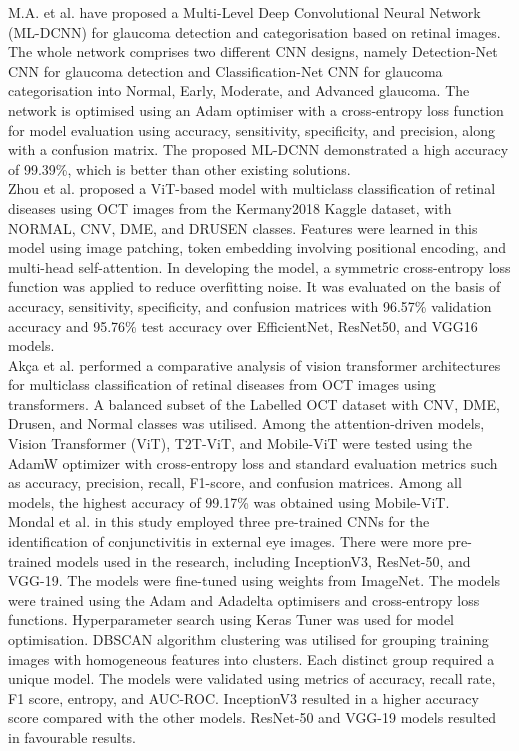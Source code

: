 \documentclass[conference,9pt]{IEEEtran}
\begin{document}
M.A. et al. \cite{2} have proposed a Multi-Level Deep Convolutional Neural Network (ML-DCNN) for glaucoma detection and categorisation based on retinal images. The whole network comprises two different CNN designs, namely Detection-Net CNN for glaucoma detection and Classification-Net CNN for glaucoma categorisation into Normal, Early, Moderate, and Advanced glaucoma. The network is optimised using an Adam optimiser with a cross-entropy loss function for model evaluation using accuracy, sensitivity, specificity, and precision, along with a confusion matrix. The proposed ML-DCNN demonstrated a high accuracy of 99.39\%, which is better than other existing solutions.\\

Zhou et al. \cite{3} proposed a ViT-based model with multiclass classification of retinal diseases using OCT images from the Kermany2018 Kaggle dataset, with NORMAL, CNV, DME, and DRUSEN classes. Features were learned in this model using image patching, token embedding involving positional encoding, and multi-head self-attention. In developing the model, a symmetric cross-entropy loss function was applied to reduce overfitting noise. It was evaluated on the basis of accuracy, sensitivity, specificity, and confusion matrices with 96.57\% validation accuracy and 95.76\% test accuracy over EfficientNet, ResNet50, and VGG16 models.\\

Akça et al.\cite{4} performed a comparative analysis of vision transformer architectures for multiclass classification of retinal diseases from OCT images using transformers. A balanced subset of the Labelled OCT dataset with CNV, DME, Drusen, and Normal classes was utilised. Among the attention-driven models, Vision Transformer (ViT), T2T-ViT, and Mobile-ViT were tested using the AdamW optimizer with cross-entropy loss and standard evaluation metrics such as accuracy, precision, recall, F1-score, and confusion matrices. Among all models, the highest accuracy of 99.17\% was obtained using Mobile-ViT.\\

Mondal et al.\cite{7} in this study employed three pre-trained CNNs for the identification of conjunctivitis in external eye images. There were more pre-trained models used in the research, including InceptionV3, ResNet-50, and VGG-19. The models were fine-tuned using weights from ImageNet. The models were trained using the Adam and Adadelta optimisers and cross-entropy loss functions. Hyperparameter search using Keras Tuner was used for model optimisation. DBSCAN algorithm clustering was utilised for grouping training images with homogeneous features into clusters. Each distinct group required a unique model. The models were validated using metrics of accuracy, recall rate, F1 score, entropy, and AUC-ROC. InceptionV3 resulted in a higher accuracy score compared with the other models. ResNet-50 and VGG-19 models resulted in favourable results.\\
\end{document}
